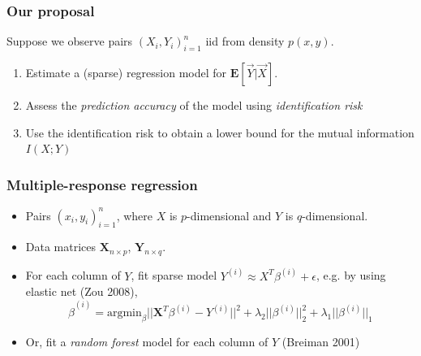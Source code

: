 \documentclass{beamer}
\newcommand{\E}{\textbf{E}}
\newcommand{\bX}{\boldsymbol{X}}
\newcommand{\bY}{\boldsymbol{Y}}
\begin{document}
\begin{frame}
\frametitle{Our proposal}
Suppose we observe pairs $(X_i,Y_i)_{i=1}^n$ iid from density $p(x, y)$.
\begin{enumerate}
\item Estimate a (sparse) regression model for $\E[\vec{Y}|\vec{X}]$.
\item Assess the \emph{prediction accuracy} of the model using \emph{identification risk}
\item Use the identification risk to obtain a lower bound for the mutual information $I(X; Y)$
\end{enumerate}
\end{frame}

\begin{frame}
\frametitle{Multiple-response regression}
\begin{itemize}
\item Pairs $(x_i,y_i)_{i=1}^n$, where $X$ is $p$-dimensional and $Y$ is $q$-dimensional.
\item Data matrices $\bX_{n \times p}$, $\bY_{n \times q}$.
\item For each column of $Y$, fit sparse model $Y^{(i)} \approx X^T \beta^{(i)}  + \epsilon$, e.g. by using elastic net (Zou 2008), 
\[
\hat{\beta}^{(i)} = \text{argmin}_\beta ||\bX^T \beta^{(i)} - Y^{(i)}||^2 + \lambda_2 ||\beta^{(i)}||_2^2 + \lambda_1 ||\beta^{(i)}||_1
\]
\item Or, fit a \emph{random forest} model for each column of $Y$ (Breiman 2001)
\end{itemize}
\end{frame}


\end{document}
